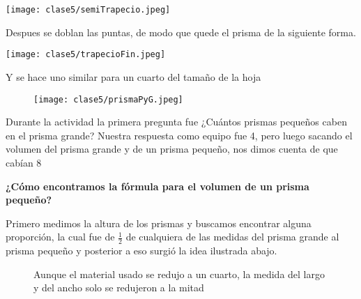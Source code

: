 \begin{center}
    \texttt{[image: clase5/semiTrapecio.jpeg]}
\end{center}

Despues se doblan las puntas, de modo que quede el prisma de la siguiente forma.

\begin{center}
    \texttt{[image: clase5/trapecioFin.jpeg]}
\end{center}

Y se hace uno similar para un cuarto del tamaño de la hoja
\begin{figure}[ht!]
    \begin{center}
        \texttt{[image: clase5/prismaPyG.jpeg]}
    \end{center}
\end{figure}

Durante la actividad la primera pregunta fue ¿Cuántos prismas pequeños caben en el prisma grande? Nuestra respuesta como equipo fue 4, pero luego sacando el volumen del prisma grande y de un prisma pequeño, nos dimos cuenta de que cabían 8

\textbf{¿Cómo encontramos la fórmula para el volumen de un prisma pequeño?}

Primero medimos la altura de los prismas y buscamos encontrar alguna proporción, la cual fue de $\frac{1}{2}$ de cualquiera de las medidas del prisma grande al prisma pequeño y posterior a eso surgió la idea ilustrada abajo. 

\begin{figure}[ht!]
    \begin{center}
    \end{center}
    \caption{Aunque el material usado se redujo a un cuarto, la medida del largo y del ancho solo se redujeron a la mitad}
\end{figure}

